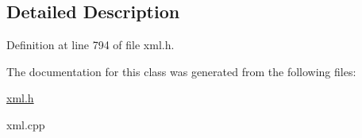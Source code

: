 \subsection{Detailed Description}


Definition at line 794 of file xml.h.



The documentation for this class was generated from the following files:\begin{DoxyCompactItemize}
\item 
\hyperlink{xml_8h}{xml.h}\item 
xml.cpp\end{DoxyCompactItemize}
